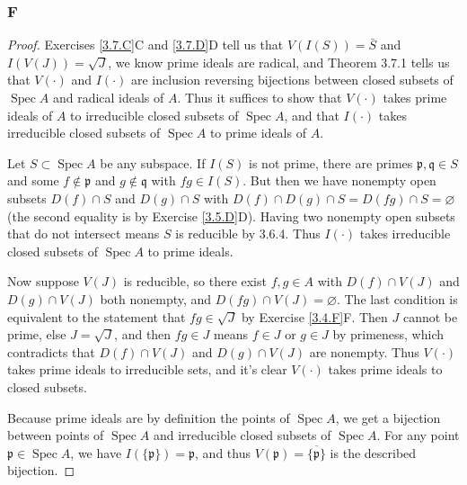 \documentclass{article}
\newcommand{\frkp}{\mathfrak{p}}
\newcommand{\frkq}{\mathfrak{q}}
\DeclareMathOperator{\Spec}{\mathrm{Spec}}
\let\emptyset\varnothing
\theoremstyle{definition} %
\begin{document}
\subsubsection{F}\label{3.7.F}
\begin{proof}
    Exercises \ref{3.7.C}C and \ref{3.7.D}D tell us that $V(I(S))=\bar S$ and $I(V(J))=\sqrt{J}$, we know prime ideals are radical, and Theorem 3.7.1 tells us that $V(\cdot)$ and $I(\cdot)$ are inclusion reversing bijections between closed subsets of $\Spec A$ and radical ideals of $A$. Thus it suffices to show that $V(\cdot)$ takes prime ideals of $A$ to irreducible closed subsets of $\Spec A$, and that $I(\cdot)$ takes irreducible closed subsets of $\Spec A$ to prime ideals of $A$.

    Let $S\subset \Spec A$ be any subspace. If $I(S)$ is not prime, there are primes $\frkp, \frkq \in S$ and some $f\notin \frkp$ and $g\notin \frkq$ with $fg\in I(S)$. But then we have nonempty open subsets $D(f)\cap S$ and $D(g)\cap S$ with $D(f)\cap D(g) \cap S=D(fg)\cap S=\emptyset$ (the second equality is by Exercise \ref{3.5.D}D). Having two nonempty open subsets that do not intersect means $S$ is reducible by 3.6.4. Thus $I(\cdot)$ takes irreducible closed subsets of $\Spec A$ to prime ideals.

    Now suppose $V(J)$ is reducible, so there exist $f,g\in A$ with $D(f)\cap V(J)$ and $D(g)\cap V(J)$ both nonempty, and $D(fg)\cap V(J)=\emptyset$. The last condition is equivalent to the statement that $fg\in \sqrt{J}$ by Exercise \ref{3.4.F}F. Then $J$ cannot be prime, else $J=\sqrt{J}$, and then $fg\in J$ means $f\in J$ or $g\in J$ by primeness, which contradicts that $D(f)\cap V(J)$ and $D(g)\cap V(J)$ are nonempty. Thus $V(\cdot)$ takes prime ideals to irreducible sets, and it's clear $V(\cdot)$ takes prime ideals to closed subsets.

    Because prime ideals are by definition the points of $\Spec A$, we get a bijection between points of $\Spec A$ and irreducible closed subsets of $\Spec A$. For any point $\frkp \in \Spec A$, we have $I(\{\frkp \})= \frkp$, and thus $V(\frkp)=\overline{\{\frkp\}}$ is the described bijection.

    
\end{proof}
\end{document}
